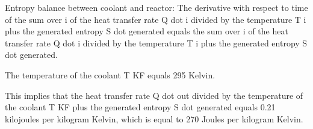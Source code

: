 Entropy balance between coolant and reactor:
The derivative with respect to time of the sum over i of the heat transfer rate Q dot i divided by the temperature T i plus the generated entropy S dot generated equals the sum over i of the heat transfer rate Q dot i divided by the temperature T i plus the generated entropy S dot generated.

The temperature of the coolant T KF equals 295 Kelvin.

This implies that the heat transfer rate Q dot out divided by the temperature of the coolant T KF plus the generated entropy S dot generated equals 0.21 kilojoules per kilogram Kelvin, which is equal to 270 Joules per kilogram Kelvin.